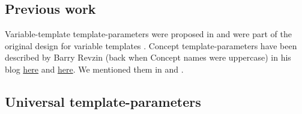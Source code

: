 \documentclass{wg21}
\begin{document}
%
%
%
%
%
%

\subsection{Previous work}

Variable-template template-parameters were proposed in  and were part of the original design for variable templates .
Concept template-parameters have been described by Barry Revzin (back when Concept names were uppercase) in his blog \href{https://brevzin.github.io/c++/2019/01/09/concept-templates/}{here} and \href{https://brevzin.github.io/c++/2019/03/24/concept-templates-2/}{here}.
We mentioned them in  and .

\subsection{Universal template-parameters}
\end{document}
